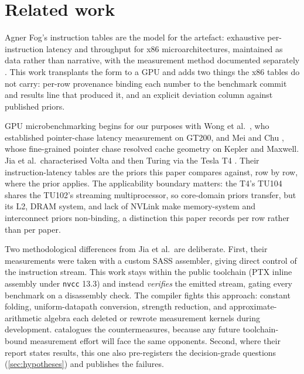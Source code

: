 \section{Related work}
\label{sec:related}

Agner Fog's instruction tables \citep{fog2025instruction} are the model
for the artefact: exhaustive per-instruction latency and throughput for
x86 microarchitectures, maintained as data rather than narrative, with
the measurement method documented separately \citep{fog2025microarch}.
This work transplants the form to a GPU and adds two things the x86
tables do not carry: per-row provenance binding each number to the
benchmark commit and results line that produced it, and an explicit
deviation column against published priors.

GPU microbenchmarking begins for our purposes with Wong et
al.\ \citep{wong2010demystifying}, who established pointer-chase latency
measurement on GT200, and Mei and Chu \citep{mei2017dissecting}, whose
fine-grained pointer chase resolved cache geometry on Kepler and Maxwell.
Jia et al.\ characterised Volta \citep{jia2018volta} and then Turing via
the Tesla T4 \citep{jia2019turing}. Their instruction-latency tables are
the priors this paper compares against, row by row, where the prior
applies. The applicability boundary matters: the T4's TU104 shares the
TU102's streaming multiprocessor, so core-domain priors transfer, but its
L2, DRAM system, and lack of NVLink make memory-system and interconnect
priors non-binding, a distinction this paper records per row rather
than per paper.

Two methodological differences from Jia et al.\ are deliberate. First,
their measurements were taken with a custom SASS assembler, giving direct
control of the instruction stream. This work stays within the public
toolchain (PTX inline assembly under \texttt{nvcc} 13.3) and instead
\emph{verifies} the emitted stream, gating every benchmark on a
disassembly check. The compiler fights this approach: constant
folding, uniform-datapath conversion, strength reduction, and
approximate-arithmetic algebra each deleted or rewrote measurement
kernels during development.  catalogues the
countermeasures, because any future toolchain-bound measurement effort
will face the same opponents. Second, where their report states results,
this one also pre-registers the decision-grade questions
(\cref{sec:hypotheses}) and publishes the failures.
